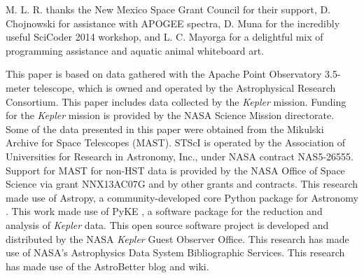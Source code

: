 \acknowledgments
M. L. R. thanks the New Mexico Space Grant Council for their support, D. Chojnowski for assistance with APOGEE spectra, D. Muna for the incredibly useful SciCoder 2014 workshop, and L. C. Mayorga for a delightful mix of programming assistance and aquatic animal whiteboard art.

This paper is based on data gathered with the Apache Point Observatory 3.5-meter telescope, which is owned and operated by the Astrophysical Research Consortium. This paper includes data collected by the \emph{Kepler} mission. Funding for the \emph{Kepler} mission is provided by the NASA Science Mission directorate. Some of the data presented in this paper were obtained from the Mikulski Archive for Space Telescopes (MAST). STScI is operated by the Association of Universities for Research in Astronomy, Inc., under NASA contract NAS5-26555. Support for MAST for non-HST data is provided by the NASA Office of Space Science via grant NNX13AC07G and by other grants and contracts. This research made use of Astropy, a community-developed core Python package for Astronomy \citep{astropy}. This work made use of PyKE \citep{pyke}, a software package for the reduction and analysis of \emph{Kepler} data. This open source software project is developed and distributed by the NASA \emph{Kepler} Guest Observer Office. This research has made use of NASA's Astrophysics Data System Bibliographic Services. This research has made use of the AstroBetter blog and wiki.